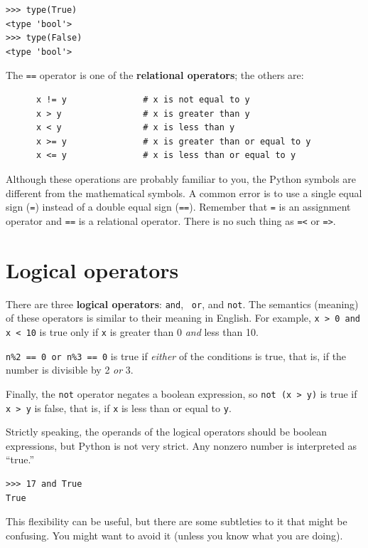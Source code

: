 \documentclass[10pt]{book}
\begin{document}
\begin{CJK}{UTF8}{gbsn}
\begin{verbatim}
>>> type(True)
<type 'bool'>
>>> type(False)
<type 'bool'>
\end{verbatim}
%
The {\tt ==} operator is one of the {\bf relational operators}; the
others are:

\begin{verbatim}
      x != y               # x is not equal to y
      x > y                # x is greater than y
      x < y                # x is less than y
      x >= y               # x is greater than or equal to y
      x <= y               # x is less than or equal to y
\end{verbatim}
%
Although these operations are probably familiar to you, the Python
symbols are different from the mathematical symbols.  A common error
is to use a single equal sign ({\tt =}) instead of a double equal sign
({\tt ==}).  Remember that {\tt =} is an assignment operator and
{\tt ==} is a relational operator.   There is no such thing as
{\tt =<} or {\tt =>}.


\section {Logical operators}

There are three {\bf logical operators}: {\tt and}, {\tt
or}, and {\tt not}.  The semantics (meaning) of these operators is
similar to their meaning in English.  For example,
{\tt x > 0 and x < 10} is true only if {\tt x} is greater than 0
{\em and} less than 10.

{\tt n\%2 == 0 or n\%3 == 0} is true if {\em either} of the conditions
is true, that is, if the number is divisible by 2 {\em or} 3.

Finally, the {\tt not} operator negates a boolean
expression, so {\tt not (x > y)} is true if {\tt x > y} is false,
that is, if {\tt x} is less than or equal to {\tt y}.

Strictly speaking, the operands of the logical operators should be
boolean expressions, but Python is not very strict.
Any nonzero number is interpreted as ``true.''

\begin{verbatim}
>>> 17 and True
True
\end{verbatim}
%
This flexibility can be useful, but there are some subtleties to
it that might be confusing.  You might want to avoid it (unless
you know what you are doing).



\end{CJK}
\end{document}
